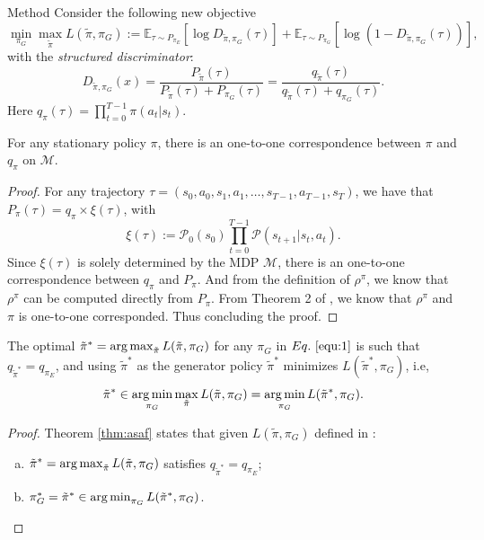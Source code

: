 \documentclass[10pt,aspectratio=169]{beamer}
\begin{document}
\begin{frame}{Method}
	Consider the following new objective
	\begin{equation}\label{equ:1}
		\min_{\pi_G}\max_{\tilde{\pi}} L(\tilde{\pi}, \pi_G) := \mathbb{E}_{\tau\sim P_{\pi_E}}\left[\log D_{\tilde{\pi}, \pi_G}(\tau)\right] + \mathbb{E}_{\tau\sim P_{\pi_G}}\left[\log (1-D_{\tilde{\pi}, \pi_G}(\tau))\right],
	\end{equation}
	with the \textit{structured discriminator}:
	\[
		D_{\tilde{\pi}, \pi_G}(x) = \frac{P_{\tilde{\pi}}(\tau)}{P_{\tilde{\pi}}(\tau) + P_{\pi_G}(\tau)} = \frac{q_{\tilde{\pi}}(\tau)}{q_{\tilde{\pi}}(\tau) + q_{\pi_G}(\tau)}.
	\]
	Here $q_\pi(\tau)=\prod_{t=0}^{T-1}\pi(a_t|s_t)$.
	\begin{theorem}\label{thm:corp}
		For any stationary policy $\pi$, there is an one-to-one correspondence between $\pi$ and $q_\pi$ on $\mathcal{M}$.
	\end{theorem}
	\begin{proof}
		For any trajectory $\tau = (s_0, a_0, s_1, a_1, \ldots, s_{T-1}, a_{T-1}, s_T)$, we have that $P_\pi(\tau) = q_\pi \times \xi(\tau)$, with
		\[\xi(\tau) := \mathcal{P}_0(s_0)\prod_{t=0}^{T-1}\mathcal{P}(s_{t+1}|s_t, a_t).\]
		Since $\xi(\tau)$ is solely determined by the MDP $\mathcal{M}$, there is an one-to-one correspondence between $q_\pi$ and $P_\pi$. And from the definition of $\rho^\pi$, we know that $\rho^\pi$ can be computed directly from $P_\pi$. From Theorem 2 of \citep{syed2008apprenticeship}, we know that $\rho^\pi$ and $\pi$ is one-to-one corresponded. Thus concluding the proof.
	\end{proof}
	\begin{theorem}\label{thm:asaf}
		The optimal $\tilde{\pi}^* = \operatorname*{arg\,max}_{\tilde{\pi}}L(\tilde{\pi}, \pi_G)$ for any $\pi_G$ in $\myeqref{equ:1}$ is such that $q_{\tilde{\pi}^*} = q_{\pi_E}$, and using $\tilde{\pi}^*$ as the generator policy $\tilde{\pi}^*$ minimizes $L(\tilde{\pi}^*, \pi_G)$, i.e,
		\[\tilde{\pi}^* \in \operatorname*{arg\,min}_{\pi_G}\max_{\tilde{\pi}}L(\tilde{\pi}, \pi_G)=\operatorname*{arg\,min}_{\pi_G}L(\tilde{\pi}^*, \pi_G).\]
	\end{theorem}
	\begin{proof}
		Theorem \ref{thm:asaf} states that given $L(\tilde{\pi}, \pi_G)$ defined in :
		\begin{enumerate}[(a)]
			\item $\tilde{\pi}^* = \operatorname*{arg\,max}_{\tilde{\pi}} L(\tilde{\pi}, \pi_G)$ satisfies $q_{\tilde{\pi}^*} = q_{\pi_E}$;
			\item $\pi^*_G = \tilde{\pi}^* \in \operatorname*{arg\,min}_{\pi_G} L(\tilde{\pi}^*, \pi_G)$.

\end{enumerate}
\end{proof}
\end{frame}
\end{document}
